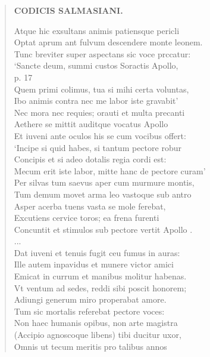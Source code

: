 \documentclass[11pt, a4paper]{report}
\begin{document}
\begin{verse}
    \begin{center} \textbf{CODICIS SALMASIANI.} \end{center} \marginpar{[51]} Atque hic exsultans animis patiensque pericli \\ Optat aprum ant fulvum descendere monte leonem. \\ Tunc breviter super aspectans sic voce prccatur: \\ ‘Sancte deum, summi custos Soractis Apollo, \\ p. 17 \\ Quem primi colimus, tua si mihi certa voluntas, \\ Ibo animis contra nec me labor iste gravabit’ \\ Nec mora nec requies; orauti et multa precanti \\ Aethere se mittit auditque vocatus Apollo \\ Et iuveni ante oculos his se cum vocibus offert: \\ ‘Incipe si quid habes, si tantum pectore robur \\ Concipis et si adeo dotalis regia cordi est: \\ Mecum erit iste labor, mitte hanc de pectore curam’ \\ Per silvas tum saevus aper cum murmure montis, \\ Tum demum movet arma leo vastoque sub antro \\ Asper acerba tuens vasta se mole ferebat, \\ Excutiens cervice toros; ea frena furenti \\ Concuntit et stimulos sub pectore vertit Apollo . \\ 
                     \lbrack ... \rbrack 
                 \\ Dat iuveni et tenuis  \lbrack fugit \rbrack  ceu fumus in auras: \\ Ille autem inpavidus et munere victor amici \\ Emicat in currum et manibus molitur habenas. \\ Vt ventum ad sedes, reddi sibi poscit honorem; \\ Adiungi generum miro properabat amore. \\ Tum sic mortalis referebat pectore voces: \\ Non haec humanis opibus, non arte magistra \\ (Accipio agnoscoque libens) tibi ducitur uxor, \\ Omnis ut tecum meritis pro talibus annos \\ 

\end{verse}
\end{document}
